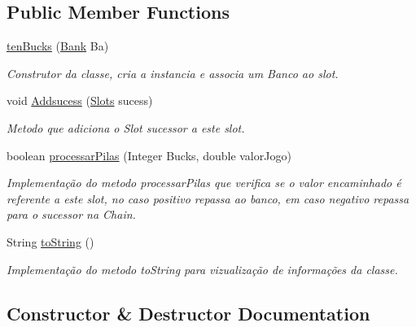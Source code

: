 \subsection*{Public Member Functions}
\begin{DoxyCompactItemize}
\item 
\mbox{\hyperlink{classchain_of_responsability_pattern_1_1ten_bucks_a12258151b4dcc5c36a53fca5b0d9f09e}{ten\+Bucks}} (\mbox{\hyperlink{classmediator_pattern_1_1_bank}{Bank}} Ba)
\begin{DoxyCompactList}\small\item\em Construtor da classe, cria a instancia e associa um Banco ao slot. \end{DoxyCompactList}\item 
void \mbox{\hyperlink{classchain_of_responsability_pattern_1_1ten_bucks_aac6711a6d9d3a73c633d359f167f87cf}{Addsucess}} (\mbox{\hyperlink{interfacechain_of_responsability_pattern_1_1_slots}{Slots}} sucess)
\begin{DoxyCompactList}\small\item\em Metodo que adiciona o Slot sucessor a este slot. \end{DoxyCompactList}\item 
boolean \mbox{\hyperlink{classchain_of_responsability_pattern_1_1ten_bucks_a3ab345bb0d74e82a74f185aabf382da6}{processar\+Pilas}} (Integer Bucks, double valor\+Jogo)
\begin{DoxyCompactList}\small\item\em Implementação do metodo processar\+Pilas que verifica se o valor encaminhado é referente a este slot, no caso positivo repassa ao banco, em caso negativo repassa para o sucessor na Chain. \end{DoxyCompactList}\item 
String \mbox{\hyperlink{classchain_of_responsability_pattern_1_1ten_bucks_adad988c7fd20a4e9bee2af9769f8164f}{to\+String}} ()
\begin{DoxyCompactList}\small\item\em Implementação do metodo to\+String para vizualização de informações da classe. \end{DoxyCompactList}\end{DoxyCompactItemize}


\subsection{Constructor \& Destructor Documentation}
\mbox{\label{classchain_of_responsability_pattern_1_1ten_bucks_a12258151b4dcc5c36a53fca5b0d9f09e}} 
